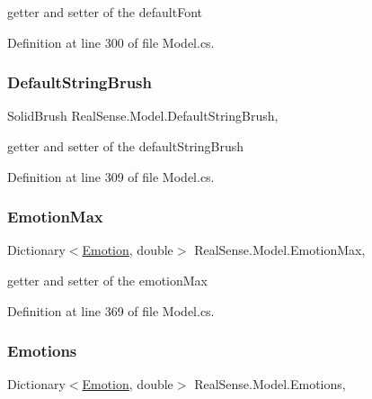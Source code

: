 getter and setter of the default\+Font 

Definition at line 300 of file Model.\+cs.

\mbox{\label{class_real_sense_1_1_model_aaee076946f30b272e403d39afe033b4e}} 
\subsubsection{\texorpdfstring{Default\+String\+Brush}{DefaultStringBrush}}
{\footnotesize\ttfamily Solid\+Brush Real\+Sense.\+Model.\+Default\+String\+Brush\hspace{0.3cm}{\ttfamily [get]}, {\ttfamily [set]}}

getter and setter of the default\+String\+Brush 

Definition at line 309 of file Model.\+cs.

\mbox{\label{class_real_sense_1_1_model_ac5454f63dfead405cd1d9c229cf6790f}} 
\subsubsection{\texorpdfstring{Emotion\+Max}{EmotionMax}}
{\footnotesize\ttfamily Dictionary$<$\hyperlink{class_real_sense_1_1_model_a5bf3fde8f53519f7a740d8b4e0399208}{Emotion}, double$>$ Real\+Sense.\+Model.\+Emotion\+Max\hspace{0.3cm}{\ttfamily [get]}, {\ttfamily [set]}}

getter and setter of the emotion\+Max 

Definition at line 369 of file Model.\+cs.

\mbox{\label{class_real_sense_1_1_model_a30358a7ea8e1e59815e2f562a3fc6bad}} 
\subsubsection{\texorpdfstring{Emotions}{Emotions}}
{\footnotesize\ttfamily Dictionary$<$\hyperlink{class_real_sense_1_1_model_a5bf3fde8f53519f7a740d8b4e0399208}{Emotion}, double$>$ Real\+Sense.\+Model.\+Emotions\hspace{0.3cm}{\ttfamily [get]}, {\ttfamily [set]}}

